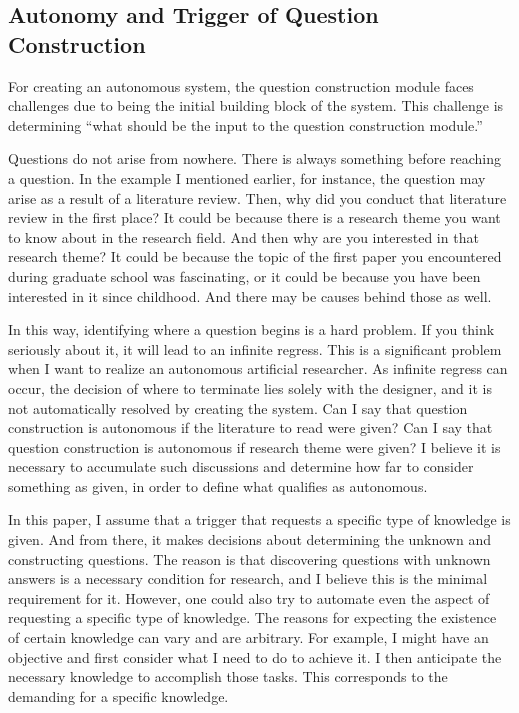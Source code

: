 \subsection{Autonomy and Trigger of Question Construction}
For creating an autonomous system, the question construction module faces challenges due to being the initial building block of the system. This challenge is determining ``what should be the input to the question construction module.''

Questions do not arise from nowhere. There is always something before reaching a question. In the example I mentioned earlier, for instance, the question may arise as a result of a literature review. Then, why did you conduct that literature review in the first place? It could be because there is a research theme you want to know about in the research field. And then why are you interested in that research theme? It could be because the topic of the first paper you encountered during graduate school was fascinating, or it could be because you have been interested in it since childhood. And there may be causes behind those as well.

In this way, identifying where a question begins is a hard problem. If you think seriously about it, it will lead to an infinite regress. This is a significant problem when I want to realize an autonomous artificial researcher. As infinite regress can occur, the decision of where to terminate lies solely with the designer, and it is not automatically resolved by creating the system. Can I say that question construction is autonomous if the literature to read were given? Can I say that question construction is autonomous if research theme were given? I believe it is necessary to accumulate such discussions and determine how far to consider something as given, in order to define what qualifies as autonomous.

In this paper, I assume that a trigger that requests a specific type of knowledge is given. And from there, it makes decisions about determining the unknown and constructing questions. The reason is that discovering questions with unknown answers is a necessary condition for research, and I believe this is the minimal requirement for it. However, one could also try to automate even the aspect of requesting a specific type of knowledge. The reasons for expecting the existence of certain knowledge can vary and are arbitrary. For example, I might have an objective and first consider what I need to do to achieve it. I then anticipate the necessary knowledge to accomplish those tasks. This corresponds to the demanding for a specific knowledge.

